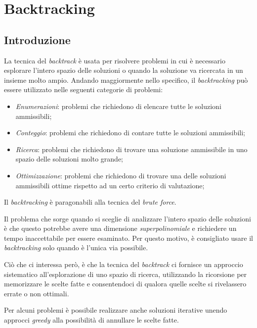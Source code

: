\chapter{Backtracking}
\section{Introduzione}
La tecnica del \emph{backtrack} è usata per risolvere problemi in cui è
necessario esplorare l'intero spazio delle soluzioni o quando la soluzione
va ricercata in un insieme molto ampio. Andando maggiormente nello specifico,
il \emph{backtracking} può essere utilizzato nelle seguenti categorie di
problemi:
\begin{itemize}
    \item \emph{Enumerazioni}: problemi che richiedono di elencare tutte le
    soluzioni ammissibili;
    \item \emph{Conteggio}: problemi che richiedono di contare tutte le
    soluzioni ammissibili;
    \item \emph{Ricerca}: problemi che richiedono di trovare una soluzione
    ammissibile in uno spazio delle soluzioni molto grande;
    \item \emph{Ottimizzazione}: problemi che richiedono di trovare una delle
    soluzioni ammissibili ottime rispetto ad un certo criterio di valutazione;
\end{itemize}
\begin{note}
    Il \emph{backtracking} è paragonabili alla tecnica del \emph{brute force}.
\end{note}

\noindent
Il problema che sorge quando si sceglie di analizzare l'intero spazio delle
soluzioni è che questo potrebbe avere una dimensione \emph{superpolinomiale}
e richiedere un tempo inaccettabile per essere esaminato. Per questo motivo,
è consigliato usare il \emph{backtracking} solo quando è l'unica via possibile.

Ciò che ci interessa però, è che la tecnica del \emph{backtrack} ci fornisce un
approccio sistematico all'esplorazione di uno spazio di ricerca, utilizzando la
ricorsione per memorizzare le scelte fatte e consentendoci di  qualora quelle scelte si rivelassero errate o non ottimali.

\begin{note}
    Per alcuni problemi è possibile realizzare anche soluzioni iterative
    unendo approcci \emph{greedy} alla possibilità di annullare le scelte fatte.
\end{note}

